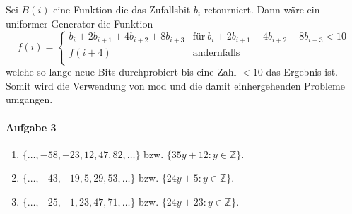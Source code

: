 \documentclass{article}
\newcommand{\cmod}{\text{mod}}
\begin{document}
Sei $B(i)$ eine Funktion die das Zufallsbit $b_i$ retourniert. Dann w\"are ein uniformer Generator die Funktion
\begin{equation*}
    f(i) = \begin{cases}
        b_{i} + 2b_{i + 1} + 4b_{i + 2} + 8b_{i + 3} & \text{f\"ur}\ b_{i} + 2b_{i + 1} + 4b_{i + 2} + 8b_{i + 3} < 10 \\
        f(i + 4) & \text{andernfalls} \\
    \end{cases}
\end{equation*}
welche so lange neue Bits durchprobiert bis eine Zahl $< 10$ das Ergebnis ist. Somit wird die Verwendung von $\cmod$ und die damit einhergehenden Probleme umgangen. 

\paragraph{Aufgabe 3}

\begin{enumerate}
    \item $\{ \ldots, -58, -23, 12, 47, 82, \ldots \}$ bzw. $\{ 35y + 12 : y \in \mathbb{Z} \}$.
    \item $\{ \ldots, -43, -19, 5, 29, 53, \ldots \}$ bzw. $\{ 24y + 5 : y \in \mathbb{Z} \}$.
    \item $\{ \ldots, -25, -1, 23, 47, 71, \ldots \}$ bzw. $\{ 24y + 23 : y \in \mathbb{Z} \}$.
\end{enumerate}
\end{document}
